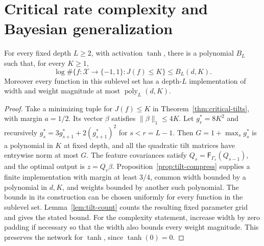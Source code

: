 \section{Critical rate complexity and Bayesian generalization}\label{app:rate-counting}
\begin{theorem}\label{thm:critical-counting}
For every fixed depth $L\geq2$, with activation $\tanh$, there is a polynomial
$B_L$ such that, for every $K\geq1$,
\[
 \log\#\{f:\mathcal X\to\{-1,1\}:J(f)\leq K\}\leq B_L(d,K).
\]
Moreover every function in this sublevel set has a depth-$L$ implementation
of width and weight magnitude at most $\operatorname{poly}_L(d,K)$.
\end{theorem}
\begin{proof}
Take a minimizing tuple for $J(f)\leq K$ in
Theorem~\ref{thm:critical-tilts}, with margin $a=1/2$.
Its vector $\beta$ satisfies $\|\beta\|_1\leq4K$.
Let $g_r^*=8K^2$ and recursively
$g_s^*=3g_{s+1}^*+2(g_{s+1}^*)^2$ for $s<r=L-1$.
Then $G=1+\max_s g_s^*$ is a polynomial in $K$ at fixed depth,
and all the quadratic tilt matrices have entrywise norm at most $G$.
The feature covariances satisfy
$Q_s=\mathsf F_{\Gamma_s}(Q_{s-1})$, and the optimal output is
$z=Q_r\beta$.
Proposition~\ref{prop:tilt-compress} supplies a finite implementation with
margin at least $3/4$, common width bounded by a polynomial in $d,K$, and
weights bounded by another such polynomial.
The bounds in its construction can be chosen uniformly for every function
in the sublevel set. Lemma~\ref{lem:tilt-count} counts the resulting fixed
parameter grid and gives the stated bound.
For the complexity statement, increase width by zero padding if necessary
so that the width also bounds every weight magnitude. This preserves the
network for $\tanh$, since $\tanh(0)=0$.
\end{proof}

